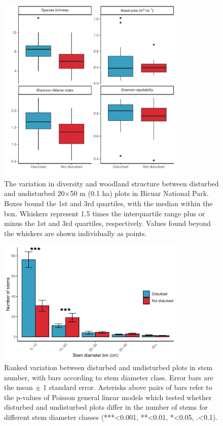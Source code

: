 \documentclass[diversity,article,submit,moreauthors,pdftex]{Definitions/mdpi}
\begin{document}
\begin{figure}[H]
\centering
	\includegraphics[width=0.8\textwidth]{img/degrad_box}
	\caption{The variation in diversity and woodland structure between disturbed and undisturbed 20$\times$50 m (0.1 ha) plots in Bicuar National Park. Boxes bound the 1st and 3rd quartiles, with the median within the box. Whiskers represent 1.5 times the interquartile range plus or minus the 1st and 3rd quartiles, respectively. Values found beyond the whiskers are shown individually as points.}
	\label{degrad_box}
\end{figure}

\rnew{

}

\begin{figure}[H]
\centering
	\includegraphics[width=0.8\textwidth]{img/degrad_dbh_bin}
	\caption{Ranked variation between disturbed and undisturbed plots in stem number, with bars according to stem diameter class. Error bars are the mean $\pm$ 1 standard error. Asterisks above pairs of bars refer to the p-values of Poisson general linear models which tested whether disturbed and undisturbed plots differ in the number of stems for different stem diameter classes (***<0.001, **<0.01, *<0.05, .<0.1).}
	\label{degrad_dbh_bin}
\end{figure}
\end{document}
